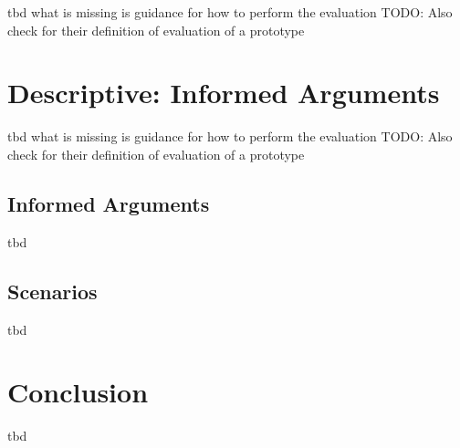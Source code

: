 tbd
what is missing is guidance for how to perform the evaluation
TODO: Also check \cite{Peffers2012} for their definition of evaluation of a prototype




\section{Descriptive: Informed Arguments}

tbd
what is missing is guidance for how to perform the evaluation
TODO: Also check \cite{Peffers2012} for their definition of evaluation of a prototype


\subsection{Informed Arguments}

tbd



\subsection{Scenarios}

tbd





\section{Conclusion}

tbd





